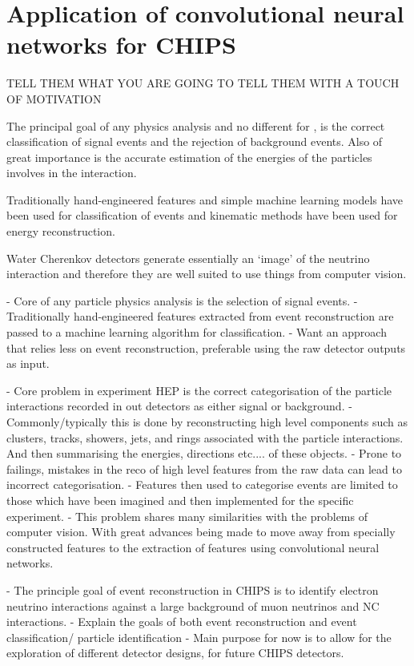 \chapter{Application of convolutional neural networks for CHIPS} %
\label{chap:cvn} %

TELL THEM WHAT YOU ARE GOING TO TELL THEM WITH A TOUCH OF MOTIVATION

The principal goal of any physics analysis and no different for \chips, is the correct
classification of signal events and the rejection of background events. Also of great importance
is the accurate estimation of the energies of the particles involves in the interaction.

Traditionally hand-engineered features and simple machine learning models have been used for
classification of events and kinematic methods have been used for energy reconstruction.

Water Cherenkov detectors generate essentially an `image' of the neutrino interaction and
therefore they are well suited to use things from computer vision.

- Core of any particle physics analysis is the selection of signal events.
- Traditionally hand-engineered features extracted from event reconstruction are passed to a
machine learning algorithm for classification.
- Want an approach that relies less on event reconstruction, preferable using the raw detector
outputs as input.

- Core problem in experiment HEP is the correct categorisation of the particle interactions
recorded in out detectors as either signal or background.
- Commonly/typically this is done by reconstructing high level components such as clusters,
tracks, showers, jets, and rings associated with the particle interactions. And then summarising
the energies, directions etc.... of these objects.
- Prone to failings, mistakes in the reco of high level features from the raw data can lead to
incorrect categorisation.
- Features then used to categorise events are limited to those which have been imagined and then
implemented for the specific experiment.
- This problem shares many similarities with the problems of computer vision. With great advances
being made to move away from specially constructed features to the extraction of features using
convolutional neural networks.

- The principle goal of event reconstruction in CHIPS is to identify electron neutrino
interactions against a large background of muon neutrinos and NC interactions.
- Explain the goals of both event reconstruction and event classification/ particle identification
- Main purpose for now is to allow for the exploration of different detector designs, for future
CHIPS detectors.


